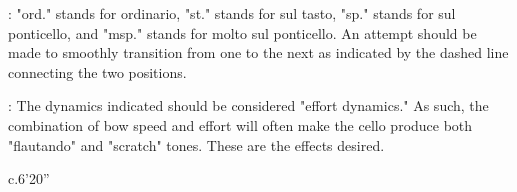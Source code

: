 \documentclass[10pt]{article}
\begin{document}
: "ord." stands for ordinario, "st." stands for sul tasto, "sp." stands for sul ponticello, and "msp." stands for molto sul ponticello. An attempt should be made to smoothly transition from one to the next as indicated by the dashed line connecting the two positions.

: The dynamics indicated should be considered "effort dynamics." As such, the combination of bow speed and effort will often make the cello produce both "flautando" and "scratch" tones. These are the effects desired.

\vspace*{1.7\baselineskip}

\begin{center}
c.6'20''
\end{center}
\end{document}
